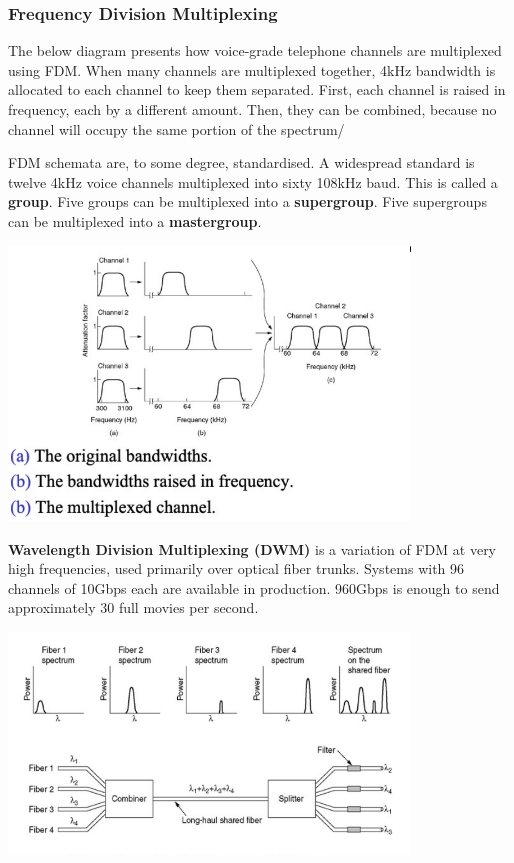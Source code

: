 \documentclass[11pt]{article}
\begin{document}
\subsubsection{Frequency Division Multiplexing}
The below diagram presents how voice-grade telephone channels are multiplexed using FDM. 
When many channels are multiplexed together, 4kHz bandwidth is allocated to each channel to keep them separated. 
First, each channel is raised in frequency, each by a different amount. 
Then, they can be combined, because no channel will occupy the same portion of the spectrum/ 

FDM schemata are, to some degree, standardised. 
A widespread standard is twelve 4kHz voice channels multiplexed into sixty 108kHz baud.
This is called a \textbf{group}. 
Five groups can be multiplexed into a \textbf{supergroup}. 
Five supergroups can be multiplexed into a \textbf{mastergroup}. 

\begin{center}
    \includegraphics[width=0.8\textwidth]{fdm.png}
\end{center}

\textbf{Wavelength Division Multiplexing (DWM)} is a variation of FDM at very high frequencies, used primarily over 
optical fiber trunks. 
Systems with 96 channels of 10Gbps each are available in production. 
960Gbps is enough to send approximately 30 full movies per second.

\begin{center}
    \includegraphics[width=0.8\textwidth]{wdm.png}
\end{center}
\end{document}
